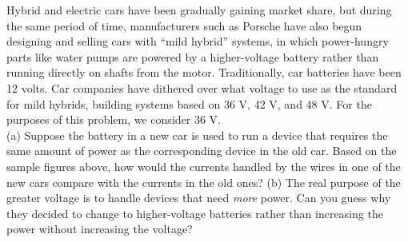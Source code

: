 Hybrid and electric cars have been gradually gaining market share, but
during the same period of time, manufacturers such as Porsche have also begun designing and
selling cars with ``mild hybrid'' systems, in which power-hungry parts like water pumps
are powered by a higher-voltage battery rather than running directly
on shafts from the motor. Traditionally, car batteries have been 12 volts.
Car companies have dithered over what voltage to use as the standard for mild hybrids,
building systems based on 36 V, 42 V, and 48 V. For the purposes of this
problem, we consider 36 V.\\
(a) Suppose the
battery in a new car is used to run a device that requires
the same amount of power as the corresponding device in the
old car. Based on the sample figures above, how would the
currents handled by the wires in one of the new cars compare
with the currents in the old ones?\answercheck\hwendpart
(b) The real purpose of
the greater voltage is to handle devices that need
\emph{more} power. Can you guess why they decided to change
to higher-voltage batteries rather than increasing the power
without increasing the voltage?

